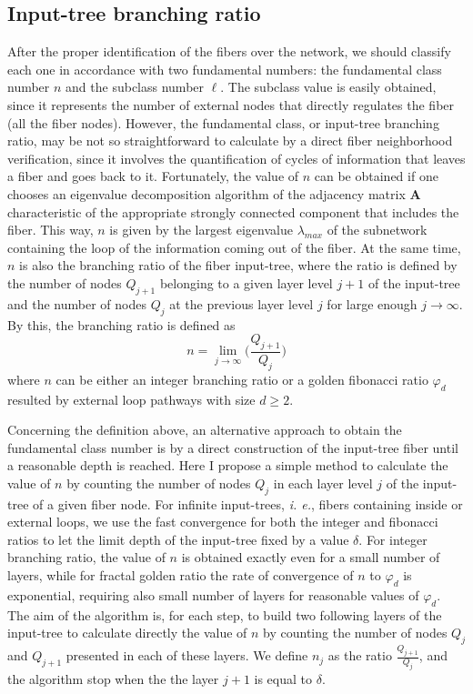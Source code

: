 \documentclass[12pt]{diazessay} %
\begin{document}
\subsection{Input-tree branching ratio}

After the proper identification of the fibers over the network, we should classify each one in accordance with two fundamental numbers: the fundamental class number $n$ and the subclass number $\ell$. The subclass value is easily obtained, since it represents the number of external nodes that directly regulates the fiber (all the fiber nodes). However, the fundamental class, or input-tree branching ratio, may be not so straightforward to calculate by a direct fiber neighborhood verification, since it involves the quantification of cycles of information that leaves a fiber and goes back to it. Fortunately, the value of $n$ can be obtained if one chooses an eigenvalue decomposition algorithm of the adjacency matrix $\mathbf{A}$ characteristic of the appropriate strongly connected component that includes the fiber. This way, $n$ is given by the largest eigenvalue $\lambda _{max}$ of the subnetwork containing the loop of the information coming out of the fiber. At the same time, $n$ is also the branching ratio of the fiber input-tree, where the ratio is defined by the number of nodes $Q_{j+1}$ belonging to a given layer level $j+1$ of the input-tree and the number of nodes $Q_j$ at the previous layer level $j$ for large enough $j \rightarrow \infty$. By this, the branching ratio is defined as
\begin{equation}
	n = \lim _{j \rightarrow \infty}\bigg(\dfrac{Q_{j+1}}{Q_j}\bigg)
\end{equation}
where $n$ can be either an integer branching ratio or a golden fibonacci ratio $\varphi_d$ resulted by external loop pathways with size $d \geq 2$. 

Concerning the definition above, an alternative approach to obtain the fundamental class number is by a direct construction of the input-tree fiber until a reasonable depth is reached. Here I propose a simple method to calculate the value of $n$ by counting the number of nodes $Q_j$ in each layer level $j$ of the input-tree of a given fiber node. For infinite input-trees, \textit{i. e.}, fibers containing inside or external loops, we use the fast convergence for both the integer and fibonacci ratios to let the limit depth of the input-tree fixed by a value $\delta$. For integer branching ratio, the value of $n$ is obtained exactly even for a small number of layers, while for fractal golden ratio the rate of convergence of $n$ to $\varphi_d$ is exponential, requiring also small number of layers for reasonable values of $\varphi_d$. The aim of the algorithm is, for each step, to build two following layers of the input-tree to calculate directly the value of $n$ by counting the number of nodes $Q_j$ and $Q_{j+1}$ presented in each of these layers. We define $n_j$ as the ratio $\frac{Q_{j+1}}{Q_j}$, and the algorithm stop when the the layer $j+1$ is equal to $\delta$.
\end{document}

